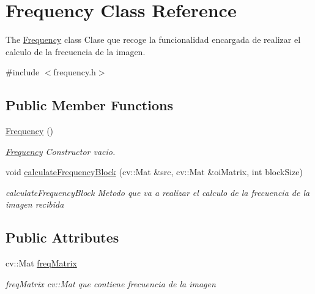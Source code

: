 \hypertarget{class_frequency}{\section{Frequency Class Reference}
\label{class_frequency}
}


The \hyperlink{class_frequency}{Frequency} class Clase que recoge la funcionalidad encargada de realizar el calculo de la frecuencia de la imagen.  




{\ttfamily \#include $<$frequency.\+h$>$}

\subsection*{Public Member Functions}
\begin{DoxyCompactItemize}
\item 
\hypertarget{class_frequency_a640e818df1d6e68f508dc21d305a7d22}{\hyperlink{class_frequency_a640e818df1d6e68f508dc21d305a7d22}{Frequency} ()}\label{class_frequency_a640e818df1d6e68f508dc21d305a7d22}

\begin{DoxyCompactList}\small\item\em \hyperlink{class_frequency}{Frequency} Constructor vacio. \end{DoxyCompactList}\item 
void \hyperlink{class_frequency_a073d778d1e37d4d83a9f52c1ba296b05}{calculate\+Frequency\+Block} (cv\+::\+Mat \&src, cv\+::\+Mat \&oi\+Matrix, int block\+Size)
\begin{DoxyCompactList}\small\item\em calculate\+Frequency\+Block Metodo que va a realizar el calculo de la frecuencia de la imagen recibida \end{DoxyCompactList}\end{DoxyCompactItemize}
\subsection*{Public Attributes}
\begin{DoxyCompactItemize}
\item 
\hypertarget{class_frequency_aa6fb6a46b73f44c471ee929d10f7d8d4}{cv\+::\+Mat \hyperlink{class_frequency_aa6fb6a46b73f44c471ee929d10f7d8d4}{freq\+Matrix}}\label{class_frequency_aa6fb6a46b73f44c471ee929d10f7d8d4}

\begin{DoxyCompactList}\small\item\em freq\+Matrix cv\+::\+Mat que contiene frecuencia de la imagen \end{DoxyCompactList}\end{DoxyCompactItemize}


